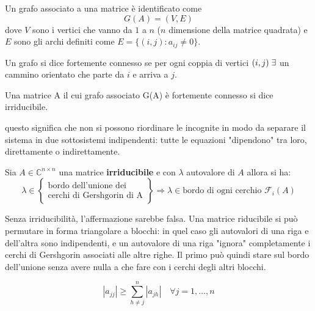 \documentclass[12pt,a4paper,]{report}
\newcommand{\s}{\hspace{1mm}}
\begin{document}
\begin{definizione}
    Un grafo associato a una matrice è identificato come
    \[
    G(A) = (V, E)
    \]
    dove $V$ sono i vertici che vanno da $1$ a $n$ ($n$ dimensione della matrice quadrata) e $E$ sono gli archi definiti come $E = \{ (i,j) : a_{ij} \neq 0 \}$.
\end{definizione}
\begin{definizione}
    Un grafo si dice fortemente connesso se per ogni coppia di vertici $(i, j)\s\exists$ un cammino orientato che parte da $i$ e arriva a $j$.
\end{definizione}
\begin{definizione}
    Una matrice A il cui grafo associato G(A) è fortemente connesso si dice irriducibile.
\end{definizione}
\begin{nota}
    questo significa che non si possono riordinare le incognite in modo da separare il sistema in due sottosistemi indipendenti: tutte le equazioni "dipendono" tra loro, direttamente o indirettamente.
\end{nota}
\begin{teorema}
    Sia $A \in \mathbb{C}^{n \times n}$ una matrice \textbf{irriducibile} e con $\lambda$ autovalore di $A$ allora si ha:
    \[
    \lambda \in 
    \left\{
    \begin{array}{c}
    \text{bordo dell'unione dei} \\
    \text{cerchi di Gershgorin di A}
    \end{array}
    \right\}
    \Longrightarrow
    \lambda \in 
    \text{bordo di ogni cerchio } \mathcal{F}_i(A)
    \]
\end{teorema}
\begin{nota}
    Senza irriducibilità, l'affermazione sarebbe falsa. Una matrice riducibile si può permutare in forma triangolare a blocchi: 
    in quel caso gli autovalori di una riga e dell'altra sono indipendenti, e un autovalore di una riga "ignora" completamente i cerchi di Gershgorin associati alle altre righe.
    Il primo può quindi stare sul bordo dell'unione senza avere nulla a che fare con i cerchi degli altri blocchi.
\end{nota}
\begin{definizione}
    \[
    |a_{jj}| \geq \sum^n_{h\neq j}|a_{jh}| \quad \forall j = 1,...,n
    \]
\end{definizione}
\end{document}
